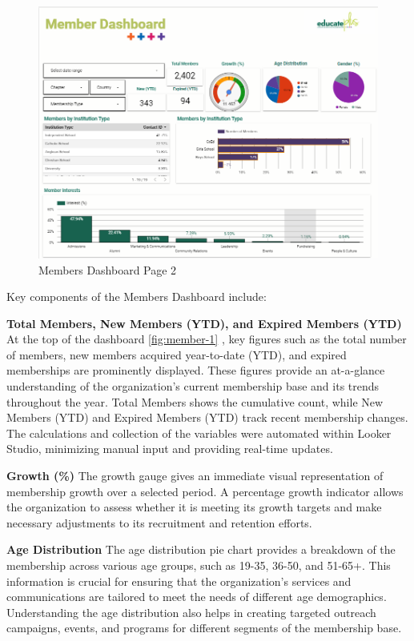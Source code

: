 \documentclass[11pt,a4paper,]{article}
\begin{document}
\begin{figure}[H]

{\centering \includegraphics[width=0.9\linewidth]{Images/members_dashboard_page_2} 

}

\caption{Members Dashboard Page 2}\label{fig:member-2}
\end{figure}

Key components of the Members Dashboard include:

\textbf{Total Members, New Members (YTD), and Expired Members (YTD)}
At the top of the dashboard \ref{fig:member-1} , key figures such as the total number of members, new members acquired year-to-date (YTD), and expired memberships are prominently displayed. These figures provide an at-a-glance understanding of the organization's current membership base and its trends throughout the year. Total Members shows the cumulative count, while New Members (YTD) and Expired Members (YTD) track recent membership changes. The calculations and collection of the variables were automated within Looker Studio, minimizing manual input and providing real-time updates.

\textbf{Growth (\%)}
The growth gauge gives an immediate visual representation of membership growth over a selected period. A percentage growth indicator allows the organization to assess whether it is meeting its growth targets and make necessary adjustments to its recruitment and retention efforts.

\textbf{Age Distribution}
The age distribution pie chart provides a breakdown of the membership across various age groups, such as 19-35, 36-50, and 51-65+. This information is crucial for ensuring that the organization's services and communications are tailored to meet the needs of different age demographics. Understanding the age distribution also helps in creating targeted outreach campaigns, events, and programs for different segments of the membership base.
\end{document}
